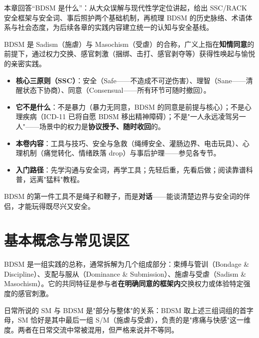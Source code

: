 \documentclass[12pt,UTF8]{ctexbook}
\newcommand{\keyword}[1]{\textbf{#1}}
\begin{document}
本章回答“BDSM 是什么”：从大众误解与现代性学定位讲起，给出 SSC/RACK 安全框架与安全词、事后照护两个基础机制，再梳理 BDSM 的历史脉络、术语体系与社会态度，为后续各章的实践内容建立统一的认知与安全基线。

BDSM 是 Sadism（施虐）与 Masochism（受虐）的合称，广义上指在\textbf{知情同意}的前提下，通过权力交换、感官刺激（捆绑、击打、感官剥夺等）获得性唤起与愉悦的亲密实践。

\begin{itemize}
\item \textbf{核心三原则（SSC）}：安全（Safe——不造成不可逆伤害）、理智（Sane——清醒状态下协商）、同意（Consensual——所有环节可随时撤回）。
\item \textbf{它不是什么}：不是暴力（暴力无同意，BDSM 的同意是前提与核心）；不是心理疾病（ICD-11\cite{who2019icd11} 已将自愿 BDSM 移出精神障碍\citep{who2019icd11}）；不是"一人永远凌驾另一人"——场景中的权力是\textbf{协议授予、随时收回}的。
\item \textbf{本卷内容}：工具与技巧、安全与急救（绳缚安全、灌肠边界、电击玩具）、心理机制（痛觉转化、情绪跌落 drop）与事后护理——参见各专节。
\item \textbf{入门路径}：先学沟通与安全词，再学工具；先轻后重，先看后做；阅读靠谱科普，远离"猛料"教程。
\end{itemize}

\begin{tcolorbox}[colback=pink!5!white,colframe=red!50!black,title=核心原则]
BDSM 的第一件工具不是绳子和鞭子，而是\textbf{对话}——能谈清楚边界与安全词的伴侣，才能玩得既尽兴又安全。
\end{tcolorbox}

\section{基本概念与常见误区}

BDSM 是一组实践的总称，通常拆解为几个组成部分：束缚与管训（Bondage \& Discipline）、支配与服从（Dominance \& Submission）、施虐与受虐（Sadism \& Masochism）。它的共同特征是参与者\keyword{在明确同意的框架内}交换权力或体验特定强度的感官刺激。

日常所说的 SM 与 BDSM 是"部分与整体"的关系：BDSM 取上述三组词组的首字母，SM 恰好是其中最后一组 S/M（施虐与受虐），负责的是"疼痛与快感"这一维度。两者在日常交流中常被混用，但严格来说并不等同。
\end{document}
